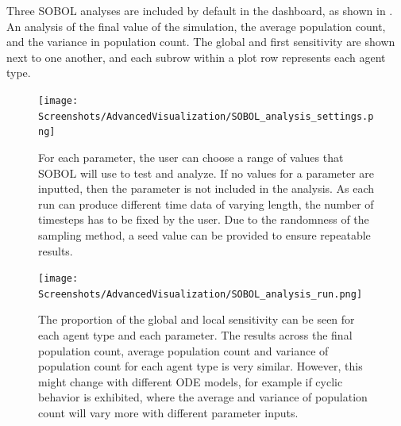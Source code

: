 Three SOBOL analyses are included by default in the dashboard, as shown in . 
An analysis of the final value of the simulation, the average population count, and the variance in population count. 
The global and first sensitivity are shown next to one another, and each subrow within a plot row represents each agent type. 
\begin{figure}
    \centering
    \texttt{[image: Screenshots/AdvancedVisualization/SOBOL\_analysis\_settings.png]}
    \caption{
		For each parameter, the user can choose a range of values that SOBOL will use to test and analyze. 
		If no values for a parameter are inputted, then the parameter is not included in the analysis. 
        As each run can produce different time data of varying length, the number of timesteps has to be fixed by the user. 
        Due to the randomness of the sampling method, a seed value can be provided to ensure repeatable results. 
    }
    \label{fig:ss:av:SOBOL_analysis_settings}
\end{figure}
\begin{figure}
    \centering
    \texttt{[image: Screenshots/AdvancedVisualization/SOBOL\_analysis\_run.png]}
    \caption{
        The proportion of the global and local sensitivity can be seen for each agent type and each parameter. 
        The results across the final population count, average population count and variance of population count for each agent type is very similar. 
        However, this might change with different ODE models, for example if cyclic behavior is exhibited, where the average and variance of population count will vary more with different parameter inputs. 
    }
    \label{fig:ss:av:SOBOL_analysis_run}
\end{figure}

